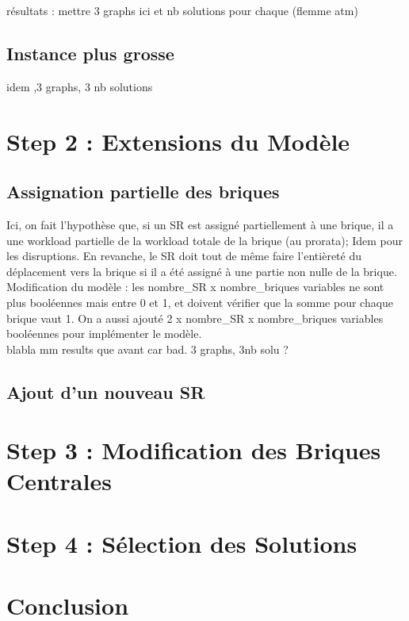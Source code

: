 \documentclass[12pt,a4paper]{article}
\begin{document}
résultats :
mettre 3 graphs ici et nb solutions pour chaque (flemme atm)

\subsection*{Instance plus grosse}

idem ,3 graphs, 3 nb solutions

\section*{Step 2 : Extensions du Modèle}

\subsection*{Assignation partielle des briques}
Ici, on fait l'hypothèse que, si un SR est assigné partiellement à une brique, il a une workload partielle de la workload totale de la brique (au prorata); Idem pour les disruptions. En revanche, le SR doit tout de même faire l'entièreté du déplacement vers la brique si il a été assigné à une partie non nulle de la brique.
\\
Modification du modèle : les nombre\_SR x nombre\_briques variables ne sont plus booléennes mais entre 0 et 1, et doivent vérifier que la somme pour chaque brique vaut 1.
On a aussi ajouté 2 x nombre\_SR x nombre\_briques variables booléennes pour implémenter le modèle.
\\
blabla mm results que avant car bad. 3 graphs, 3nb solu ?

\subsection*{Ajout d'un nouveau SR}

\section*{Step 3 : Modification des Briques Centrales}


\section*{Step 4 : Sélection des Solutions}


\section*{Conclusion}
\end{document}
